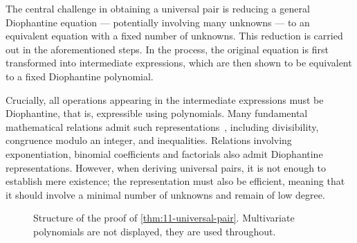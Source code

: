 \documentclass[a4paper,USenglish,cleveref,autoref,thm-restate]{lipics-v2021}
\newcommand{\N}{{\mathbb N}}
\newcommand{\Z}{{\mathbb Z}}
\begin{document}
The central challenge in obtaining a universal pair is reducing a general Diophantine equation --- potentially involving many unknowns --- to an equivalent equation with a fixed number of unknowns. This reduction is carried out in the aforementioned steps. In the process, the original equation is first transformed into intermediate expressions, which are then shown to be equivalent to a fixed Diophantine polynomial.

Crucially, all operations appearing in the intermediate expressions must be Diophantine, that is, expressible using polynomials. Many fundamental mathematical relations admit such representations~\cite{matiyasevich-book}, including divisibility, congruence modulo an integer, and inequalities. Relations involving exponentiation, binomial coefficients and factorials also admit Diophantine representations. However, when deriving universal pairs, it is not enough to establish mere existence; the representation must also be efficient, meaning that it should involve a minimal number of unknowns and remain of low degree.

\begin{figure}
    \centering

    \caption{Structure of the proof of \cref{thm:11-universal-pair}. Multivariate polynomials are not displayed, they are used throughout.}
    \label{fig:proof-structure}
\end{figure}
\end{document}
